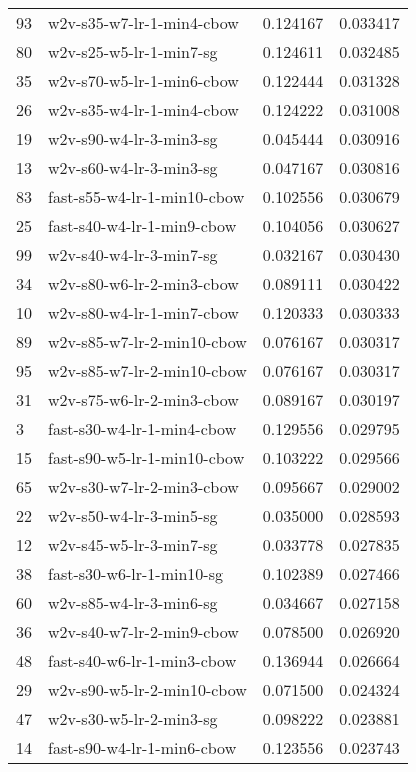 {\begin{tabular}{llrr}
93 &    w2v-s35-w7-lr-1-min4-cbow &  0.124167 &  0.033417 \\
80 &      w2v-s25-w5-lr-1-min7-sg &  0.124611 &  0.032485 \\
35 &    w2v-s70-w5-lr-1-min6-cbow &  0.122444 &  0.031328 \\
26 &    w2v-s35-w4-lr-1-min4-cbow &  0.124222 &  0.031008 \\
19 &      w2v-s90-w4-lr-3-min3-sg &  0.045444 &  0.030916 \\
13 &      w2v-s60-w4-lr-3-min3-sg &  0.047167 &  0.030816 \\
83 &  fast-s55-w4-lr-1-min10-cbow &  0.102556 &  0.030679 \\
25 &   fast-s40-w4-lr-1-min9-cbow &  0.104056 &  0.030627 \\
99 &      w2v-s40-w4-lr-3-min7-sg &  0.032167 &  0.030430 \\
34 &    w2v-s80-w6-lr-2-min3-cbow &  0.089111 &  0.030422 \\
10 &    w2v-s80-w4-lr-1-min7-cbow &  0.120333 &  0.030333 \\
89 &   w2v-s85-w7-lr-2-min10-cbow &  0.076167 &  0.030317 \\
95 &   w2v-s85-w7-lr-2-min10-cbow &  0.076167 &  0.030317 \\
31 &    w2v-s75-w6-lr-2-min3-cbow &  0.089167 &  0.030197 \\
3  &   fast-s30-w4-lr-1-min4-cbow &  0.129556 &  0.029795 \\
15 &  fast-s90-w5-lr-1-min10-cbow &  0.103222 &  0.029566 \\
65 &    w2v-s30-w7-lr-2-min3-cbow &  0.095667 &  0.029002 \\
22 &      w2v-s50-w4-lr-3-min5-sg &  0.035000 &  0.028593 \\
12 &      w2v-s45-w5-lr-3-min7-sg &  0.033778 &  0.027835 \\
38 &    fast-s30-w6-lr-1-min10-sg &  0.102389 &  0.027466 \\
60 &      w2v-s85-w4-lr-3-min6-sg &  0.034667 &  0.027158 \\
36 &    w2v-s40-w7-lr-2-min9-cbow &  0.078500 &  0.026920 \\
48 &   fast-s40-w6-lr-1-min3-cbow &  0.136944 &  0.026664 \\
29 &   w2v-s90-w5-lr-2-min10-cbow &  0.071500 &  0.024324 \\
47 &      w2v-s30-w5-lr-2-min3-sg &  0.098222 &  0.023881 \\
14 &   fast-s90-w4-lr-1-min6-cbow &  0.123556 &  0.023743 \\

\end{tabular}}
